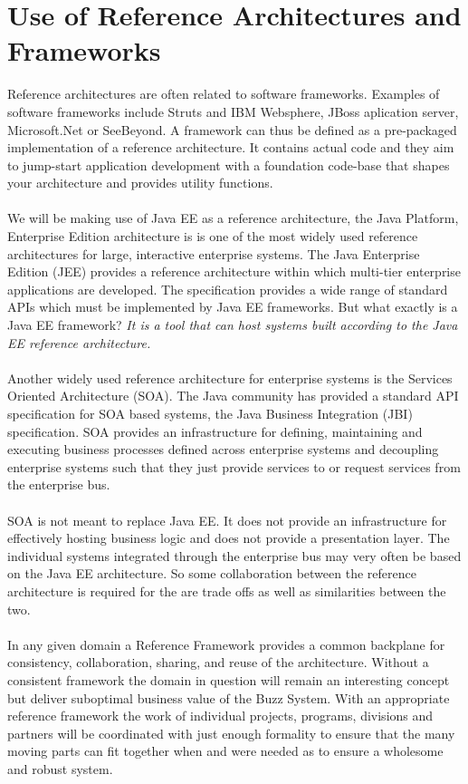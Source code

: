 \documentclass[a4paper]{article}
\begin{document}
\section{Use of Reference Architectures and Frameworks}
Reference architectures are often related to software frameworks. Examples of software frameworks include Struts and IBM
Websphere, JBoss aplication server, Microsoft.Net or SeeBeyond.
A framework can thus be defined as a pre-packaged implementation of a reference architecture. It contains actual code and they aim to jump-start application development with a foundation code-base that shapes your architecture and provides utility functions. 
\\\\
We will be making use of Java EE as a reference architecture, the Java Platform, Enterprise Edition architecture is is one of the most widely used reference architectures for large, interactive enterprise systems. The Java Enterprise Edition (JEE) provides a reference architecture within which multi-tier enterprise applications are developed. The specification provides a wide range of standard APIs which must be implemented by Java EE frameworks. But what exactly is a Java EE framework? \textit{It is a tool that can host systems built according to the Java EE reference architecture.}
\\\\
Another widely used reference architecture for enterprise systems is the Services Oriented Architecture (SOA). The Java community has provided a standard API specification for SOA based systems, the Java Business Integration (JBI) specification. SOA provides an infrastructure for defining, maintaining and executing business processes defined across enterprise systems and decoupling enterprise systems such that they just provide services to or request services from the enterprise bus.
\\\\
SOA is not meant to replace Java EE. It does not provide an infrastructure for effectively hosting business logic and does not provide a presentation layer. The individual systems integrated through the enterprise bus may very often be based on the Java EE architecture. So some collaboration between the reference architecture is required for the are trade offs as well as similarities between the two.
\\\\
In any given domain  a Reference Framework  provides a common backplane for consistency, collaboration, sharing, and reuse of the architecture. Without a consistent framework the domain in question will remain an interesting concept but deliver suboptimal business value of the Buzz System. With an appropriate reference framework the work of individual projects, programs, divisions and partners will be coordinated with just enough formality to ensure that the many moving parts can fit together when and were needed as to ensure a wholesome and robust system.
\end{document}
